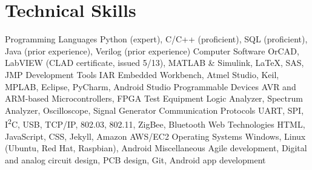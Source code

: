 \section{Technical Skills}
\begin{cvskills}
  \cvskill
    {Programming Languages}
    {Python (expert), C/C++ (proficient), SQL (proficient), Java (prior experience), Verilog (prior experience)}
  \cvskill
    {Computer Software}
    {OrCAD, LabVIEW (CLAD certificate, issued 5/13), MATLAB \& Simulink, \LaTeX, SAS, JMP}
  \cvskill
    {Development Tools}
    {IAR Embedded Workbench, Atmel Studio, Keil, MPLAB, Eclipse, PyCharm, Android Studio}
  \cvskill
    {Programmable Devices}
    {AVR and ARM-based Microcontrollers, FPGA}
  \cvskill
    {Test Equipment}
    {Logic Analyzer, Spectrum Analyzer, Oscilloscope, Signal Generator}
  \cvskill
    {Communication Protocols}
    {UART, SPI, I\textsuperscript{2}C, USB, TCP/IP, 802.03, 802.11, ZigBee, Bluetooth}
  \cvskill
    {Web Technologies}
    {HTML, JavaScript, CSS, Jekyll, Amazon AWS/EC2}
  \cvskill
    {Operating Systems}
    {Windows, Linux (Ubuntu, Red Hat, Raspbian), Android}
  \cvskill
    {Miscellaneous}
    {Agile development, Digital and analog circuit design, PCB design, Git, Android app development}
\end{cvskills}
